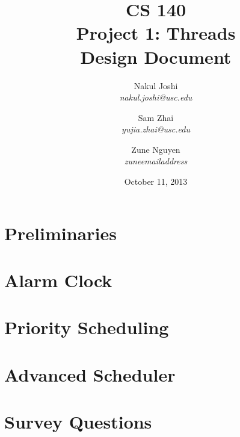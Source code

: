 \documentclass[titlepage]{article}
\title{CS 140\\Project 1: Threads\\Design Document}
\author{
	Nakul Joshi\\ \textit{nakul.joshi@usc.edu}\and
	Sam Zhai\\ \textit{yujia.zhai@usc.edu}\and
	Zune Nguyen\\ \textit{zuneemailaddress}
	}
\date{October 11, 2013}
\begin{document}
\maketitle
\tableofcontents
\newpage
\section{Preliminaries}
	
\section{Alarm Clock}
	
\section{Priority Scheduling}
	
\section{Advanced Scheduler}
	
\section{Survey Questions}
	
\end{document}
